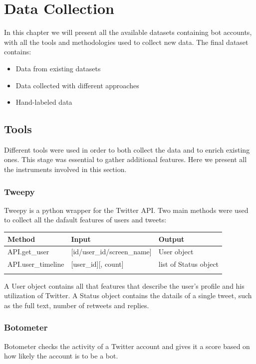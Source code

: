
\chapter{Data Collection}
\label{capitolo3}
\thispagestyle{empty}


In this chapter we will present all the available datasets containing bot accounts, with all the tools and methodologies used to collect new data. The final dataset contains:

\begin{itemize}
\item[\PencilRight]Data from existing datasets
\item[\PencilRight]Data collected with different approaches
\item[\PencilRight]Hand-labeled data
\end{itemize}

\section{Tools}
Different tools were used in order to both collect the data and to enrich existing ones. This stage was essential to gather additional features. Here we present all the instruments involved in this section.

\subsection{Tweepy}
Tweepy is a python wrapper for the Twitter API.
Two main methods were used to collect all the dafault features of users and tweets:\\


\begin{tabular}{lll}
\centering	
	Method&Input&Output\\ \hline\hline
	API.get\_user&[id/user\_id/screen\_name]&User object\\
	API.user\_timeline&[user\_id][, count]&list of Status object\\ \hline\\
\end{tabular}

A User object contains all that features that describe the user's profile and his utilization of Twitter.
A Status object contains the datails of a single tweet, such as the full text, number of retweets and replies.

\subsection{Botometer}
Botometer \cite{Botometer} checks the activity of a Twitter account and gives it a score based on how likely the account is to be a bot.

